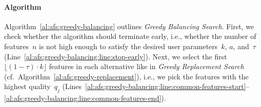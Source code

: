 \documentclass{article}
\theoremstyle{definition}
\begin{document}
\paragraph{Algorithm}

Algorithm~\ref{al:afs:greedy-balancing} outlines \emph{Greedy Balancing Search}.
First, we check whether the algorithm should terminate early, i.e., whether the number of features~$n$ is not high enough to satisfy the desired user parameters~$k$, $a$, and~$\tau$ (Line~\ref{al:afs:greedy-balancing:line:stop-early}).
Next, we select the first $\lfloor (1 - \tau) \cdot k \rfloor$ features in each alternative like in \emph{Greedy Replacement Search} (cf.~Algorithm~\ref{al:afs:greedy-replacement}), i.e., we pick the features with the highest quality~$q_j$ (Lines~\ref{al:afs:greedy-balancing:line:common-features-start}--\ref{al:afs:greedy-balancing:line:common-features-end}).
\end{document}
